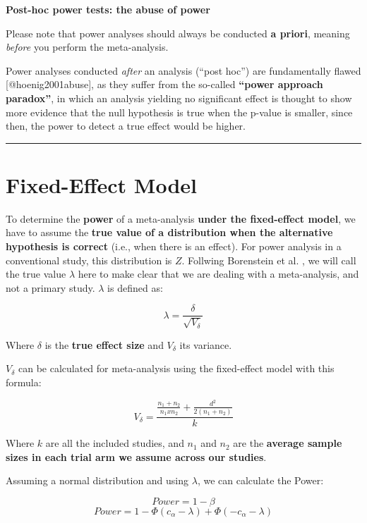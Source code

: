 \documentclass[]{book}
\theoremstyle{definition}
\theoremstyle{definition}
\theoremstyle{definition}
\theoremstyle{remark}
\begin{document}
\begin{rmdachtung}
\textbf{Post-hoc power tests: the abuse of power}

Please note that power analyses should always be conducted \textbf{a
priori}, meaning \emph{before} you perform the meta-analysis.

Power analyses conducted \emph{after} an analysis (``post hoc'') are
fundamentally flawed {[}@hoenig2001abuse{]}, as they suffer from the
so-called \textbf{``power approach paradox''}, in which an analysis
yielding no significant effect is thought to show more evidence that the
null hypothesis is true when the p-value is smaller, since then, the
power to detect a true effect would be higher.
\end{rmdachtung}

\begin{center}\rule{0.5\linewidth}{\linethickness}\end{center}

\hypertarget{fixed.power}{\section{Fixed-Effect
Model}\label{fixed.power}}

To determine the \textbf{power} of a meta-analysis \textbf{under the
fixed-effect model}, we have to assume the \textbf{true value of a
distribution when the alternative hypothesis is correct} (i.e., when
there is an effect). For power analysis in a conventional study, this
distribution is \(Z\). Follwing Borenstein et al.
\citep{borenstein2011}, we will call the true value \(\lambda\) here to
make clear that we are dealing with a meta-analysis, and not a primary
study. \(\lambda\) is defined as:

\[\lambda=\frac{\delta}{\sqrt{V_{\delta}}}\]

Where \(\delta\) is the \textbf{true effect size} and \(V_{\delta}\) its
variance.

\(V_{\delta}\) can be calculated for meta-analysis using the
fixed-effect model with this formula:

\[V_{\delta}=\frac{\frac{n_1+n_2}{n_1xn_2}+\frac{d^2}{2(n_1+n_2)}}{k}\]

Where \(k\) are all the included studies, and \(n_1\) and \(n_2\) are
the \textbf{average sample sizes in each trial arm we assume across our
studies}.

Assuming a normal distribution and using \(\lambda\), we can calculate
the Power:

\[Power = 1- \beta\]
\[Power = 1- \Phi(c_{\alpha}-\lambda)+\Phi(-c_{\alpha}-\lambda) \]
\end{document}

